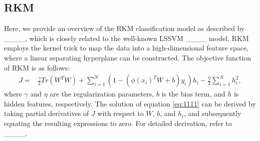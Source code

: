 \subsection{RKM}
Here, we provide an overview of the RKM classification model as described by ____, which is closely related to the well-known LSSVM ____ model. RKM employs the kernel trick to map the data into a high-dimensional feature space, where a linear separating hyperplane can be constructed. The objective function of RKM is as follows:
\begin{align}
\label{eq:1111}
      J = & \frac{\gamma}{2} Tr(W^TW) + \sum_{i=1}^N (1-(\phi(x_i)^TW+b)y_i)h_i - \frac{\eta}{2} \sum_{i=1}^Nh_i^2,
\end{align}
where $\gamma$ and $\eta$ are the regularization parameters, $b$ is the bias term, and $h$ is hidden features, respectively. The solution of equation \eqref{eq:1111} can be derived by taking partial derivatives of $J$ with respect to $W$, $b$, and $h_i$, and subsequently equating the resulting expressions to zero. For detailed derivation, refer to ____.